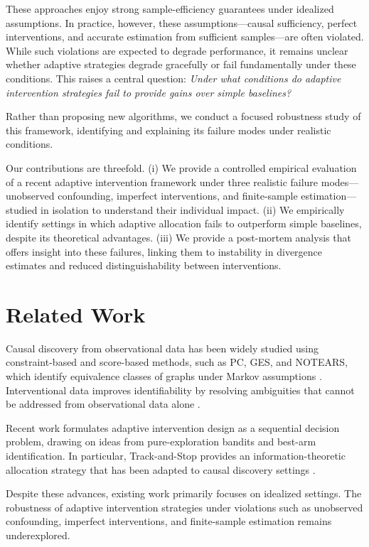 \documentclass{article}
\begin{document}
These approaches enjoy strong sample-efficiency guarantees under idealized assumptions. In practice, however, these assumptions—causal sufficiency, perfect interventions, and accurate estimation from sufficient samples—are often violated. While such violations are expected to degrade performance, it remains unclear whether adaptive strategies degrade gracefully or fail fundamentally under these conditions. This raises a central question: \emph{Under what conditions do adaptive intervention strategies fail to provide gains over simple baselines?}

Rather than proposing new algorithms, we conduct a focused robustness study of this framework, identifying and explaining its failure modes under realistic conditions.

Our contributions are threefold. (i) We provide a controlled empirical evaluation of a recent adaptive intervention framework under three realistic failure modes—unobserved confounding, imperfect interventions, and finite-sample estimation—studied in isolation to understand their individual impact. (ii) We empirically identify settings in which adaptive allocation fails to outperform simple baselines, despite its theoretical advantages. (iii) We provide a post-mortem analysis that offers insight into these failures, linking them to instability in divergence estimates and reduced distinguishability between interventions.

\section{Related Work}
Causal discovery from observational data has been widely studied using constraint-based and score-based methods, such as PC, GES, and NOTEARS, which identify equivalence classes of graphs under Markov assumptions \citep{spirtes2000causation, chickering2002optimal, zheng2018dags}. Interventional data improves identifiability by resolving ambiguities that cannot be addressed from observational data alone \citep{eberhardt2007interventions}.

Recent work formulates adaptive intervention design as a sequential decision problem, drawing on ideas from pure-exploration bandits and best-arm identification. In particular, Track-and-Stop \citep{garivier2016optimal} provides an information-theoretic allocation strategy that has been adapted to causal discovery settings \citep{elahi2024adaptive}.

Despite these advances, existing work primarily focuses on idealized settings. The robustness of adaptive intervention strategies under violations such as unobserved confounding, imperfect interventions, and finite-sample estimation remains underexplored.
\end{document}
